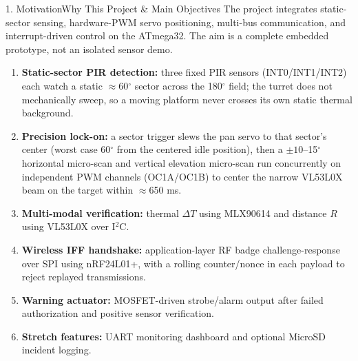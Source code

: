 \documentclass[aspectratio=169, 10pt]{beamer}
\begin{document}
\begin{frame}{1. Motivation}{Why This Project \& Main Objectives}
    \footnotesize The project integrates static-sector sensing, hardware-PWM servo positioning, multi-bus communication, and interrupt-driven control on the ATmega32. The aim is a complete embedded prototype, not an isolated sensor demo.
    \vspace{0.05cm}
    \begin{enumerate}
        \footnotesize
        \item \textbf{Static-sector PIR detection:} three fixed PIR sensors (INT0/INT1/INT2) each watch a static $\approx$60$^\circ$ sector across the 180$^\circ$ field; the turret does not mechanically sweep, so a moving platform never crosses its own static thermal background.
        \item \textbf{Precision lock-on:} a sector trigger slews the pan servo to that sector's center (worst case 60$^\circ$ from the centered idle position), then a $\pm 10$--15$^\circ$ horizontal micro-scan and vertical elevation micro-scan run concurrently on independent PWM channels (OC1A/OC1B) to center the narrow VL53L0X beam on the target within $\approx$650 ms.
        \item \textbf{Multi-modal verification:} thermal $\Delta T$ using MLX90614 and distance $R$ using VL53L0X over I$^2$C.
        \item \textbf{Wireless IFF handshake:} application-layer RF badge challenge-response over SPI using nRF24L01+, with a rolling counter/nonce in each payload to reject replayed transmissions.
        \item \textbf{Warning actuator:} MOSFET-driven strobe/alarm output after failed authorization and positive sensor verification.
        \item \textbf{Stretch features:} UART monitoring dashboard and optional MicroSD incident logging.
    \end{enumerate}
\end{frame}
\end{document}
